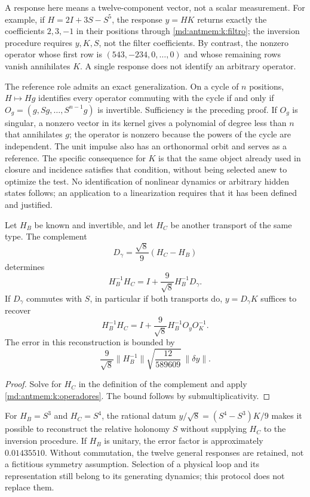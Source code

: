 A response here means a twelve-component vector, not a scalar
measurement. For example, if \(H=2I+3S-S^5\), the response
\(y=HK\) returns exactly the coefficients \(2,3,-1\) in their
positions through \eqref{md:antmem:k:filtro}; the inversion procedure requires \(y,K,S\),
not the filter coefficients. By contrast, the nonzero operator whose first
row is \((543,-234,0,\ldots,0)\) and whose remaining rows vanish
annihilates \(K\). A single response does not identify an arbitrary operator.

The reference role admits an exact generalization. On a cycle of
\(n\) positions, \(H\mapsto Hg\) identifies every operator
commuting with the cycle if and only if
\(O_g=(g,Sg,\ldots,S^{n-1}g)\) is invertible. Sufficiency is the
preceding proof. If \(O_g\) is singular, a nonzero vector in its kernel
gives a polynomial of degree less than \(n\) that annihilates \(g\); the operator
is nonzero because the powers of the cycle are independent. The unit
impulse also has an orthonormal orbit and serves as a reference. The
specific consequence for \(K\) is that the same object already used in
closure and incidence satisfies that condition, without being selected
anew to optimize the test. No identification of nonlinear
dynamics or arbitrary hidden states follows; an application to
a linearization requires that it has been defined and justified.

\begin{corollary}
\label{md:antmem:k:holonomia}
Let \(H_B\) be known and invertible, and let \(H_C\) be another transport of
the same type. The complement
\[
 D_\gamma=\frac{\sqrt8}{9}(H_C-H_B)
\]
determines
\[
 H_B^{-1}H_C=I+\frac9{\sqrt8}H_B^{-1}D_\gamma.
\]
If \(D_\gamma\) commutes with \(S\), in particular if both
transports do, \(y=D_\gamma K\) suffices to recover
\begin{equation}
 H_B^{-1}H_C
 =I+\frac9{\sqrt8}H_B^{-1}O_yO_K^{-1}.
 \label{md:antmem:k:holonomia-una-respuesta}
\end{equation}
The error in this reconstruction is bounded by
\[
 \frac9{\sqrt8}\|H_B^{-1}\|
 \sqrt{\frac{12}{589609}}\,\|\delta y\|.
\]
\end{corollary}
\begin{proof}
Solve for \(H_C\) in the definition of the complement and apply
\cref{md:antmem:k:operadores}. The bound follows by submultiplicativity.
\end{proof}

For \(H_B=S^3\) and \(H_C=S^4\), the rational datum
\(y/\sqrt8=(S^4-S^3)K/9\) makes it possible to reconstruct the relative holonomy
\(S\) without supplying \(H_C\) to the inversion procedure. If \(H_B\) is
unitary, the error factor is approximately \(0.01435510\). Without
commutation, the twelve general responses are retained, not a fictitious
symmetry assumption. Selection of a physical loop and its representation
still belong to its generating dynamics; this protocol does not
replace them.


